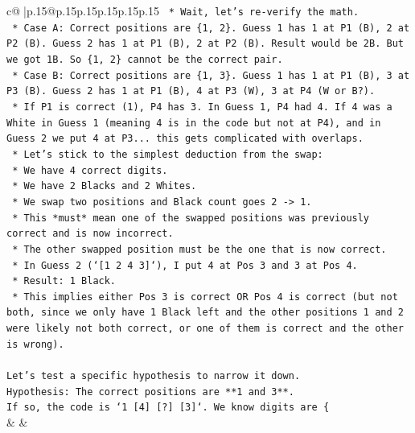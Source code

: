 \documentclass{article}
\begin{document}
{\begin{supertabular}{c@{$\;$}|p{.15\linewidth}@{}p{.15\linewidth}p{.15\linewidth}p{.15\linewidth}p{.15\linewidth}p{.15\linewidth}}
{{{\texttt{    *   Wait, let's re{-}verify the math.} \\
\texttt{        *   Case A: Correct positions are \{1, 2\}. Guess 1 has 1 at P1 (B), 2 at P2 (B). Guess 2 has 1 at P1 (B), 2 at P2 (B). Result would be 2B. But we got 1B. So \{1, 2\} cannot be the correct pair.} \\
\texttt{        *   Case B: Correct positions are \{1, 3\}. Guess 1 has 1 at P1 (B), 3 at P3 (B). Guess 2 has 1 at P1 (B), 4 at P3 (W), 3 at P4 (W or B?).} \\
\texttt{            *   If P1 is correct (1), P4 has 3. In Guess 1, P4 had 4. If 4 was a White in Guess 1 (meaning 4 is in the code but not at P4), and in Guess 2 we put 4 at P3... this gets complicated with overlaps.} \\
\texttt{    *   Let's stick to the simplest deduction from the swap:} \\
\texttt{        *   We have 4 correct digits.} \\
\texttt{        *   We have 2 Blacks and 2 Whites.} \\
\texttt{        *   We swap two positions and Black count goes 2 {-}> 1.} \\
\texttt{        *   This *must* mean one of the swapped positions was previously correct and is now incorrect.} \\
\texttt{        *   The other swapped position must be the one that is now correct.} \\
\texttt{        *   In Guess 2 (`{[}1 2 4 3{]}`), I put 4 at Pos 3 and 3 at Pos 4.} \\
\texttt{        *   Result: 1 Black.} \\
\texttt{        *   This implies either Pos 3 is correct OR Pos 4 is correct (but not both, since we only have 1 Black left and the other positions 1 and 2 were likely not both correct, or one of them is correct and the other is wrong).} \\
\\ 
\texttt{Let's test a specific hypothesis to narrow it down.} \\
\texttt{Hypothesis: The correct positions are **1 and 3**.} \\
\texttt{If so, the code is `1 {[}4{]} {[}?{]} {[}3{]}`. We know digits are \{} \\
            }
        }
    }
    & & \\ \\


\end{supertabular}}
\end{document}
